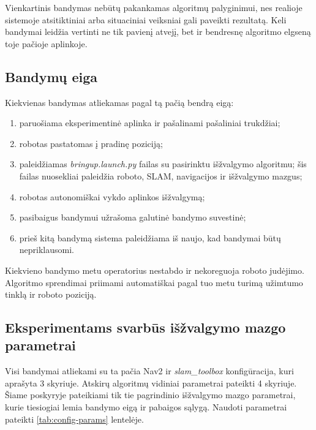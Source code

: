 \documentclass[]{VUMIFTemplateClass}
\begin{document}
Vienkartinis bandymas nebūtų pakankamas algoritmų palyginimui, nes realioje sistemoje atsitiktiniai arba situaciniai veiksniai gali paveikti rezultatą. Keli
bandymai leidžia vertinti ne tik pavienį atvejį, bet ir bendresnę algoritmo elgseną toje pačioje aplinkoje.

\subsection{Bandymų eiga}

Kiekvienas bandymas atliekamas pagal tą pačią bendrą eigą:
\begin{enumerate}
  \item paruošiama eksperimentinė aplinka ir pašalinami pašaliniai trukdžiai;
  \item robotas pastatomas į pradinę poziciją;
  \item paleidžiamas \textit{bringup.launch.py} failas su pasirinktu išžvalgymo algoritmu; šis failas nuosekliai paleidžia roboto, SLAM, navigacijos ir išžvalgymo mazgus;
  \item robotas autonomiškai vykdo aplinkos išžvalgymą;
  \item pasibaigus bandymui užrašoma galutinė bandymo suvestinė;
  \item prieš kitą bandymą sistema paleidžiama iš naujo, kad bandymai būtų nepriklausomi.
\end{enumerate}

Kiekvieno bandymo metu operatorius nestabdo ir nekoreguoja roboto judėjimo. Algoritmo sprendimai priimami
automatiškai pagal tuo metu turimą užimtumo tinklą ir roboto poziciją.

\subsection{Eksperimentams svarbūs išžvalgymo mazgo parametrai}

Visi bandymai atliekami su ta pačia Nav2 ir \textit{slam\_toolbox} konfigūracija, kuri aprašyta 3 skyriuje. Atskirų algoritmų vidiniai parametrai pateikti 4
skyriuje. Šiame poskyryje pateikiami tik tie pagrindinio išžvalgymo mazgo parametrai, kurie tiesiogiai lemia bandymo eigą ir pabaigos sąlygą. Naudoti
parametrai pateikti \ref{tab:config-params} lentelėje.
\end{document}
